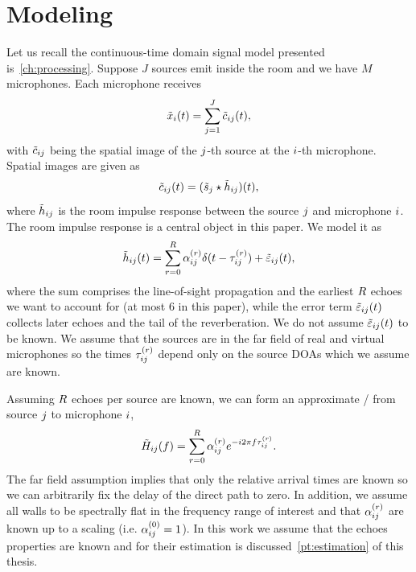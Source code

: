 \section{Modeling}
Let us recall the continuous-time domain signal model presented is~\cref{ch:processing}.
Suppose $J$ sources emit inside the room and we have $M$ microphones.
Each microphone receives
\begin{equation}
    \tilde{x}_{i}(t) = \sum_{j = 1}^{J} \tilde{c}_{ij}(t),
\end{equation}
with $\tilde{c}_{ij}$ being the spatial image of the $j$-th source at the $i$-th microphone.
Spatial images are given as
\begin{equation}
    \tilde{c}_{ij}(t) = (\tilde{s}_{j} \star \tilde{h}_{ij})(t),
\end{equation}
where $\tilde{h}_{ij}$ is the room impulse response between the source $j$ and microphone $i$.
The room impulse response is a central object in this paper.
We model it as
\begin{equation}
    \tilde{h}_{ij}(t) = \sum_{r = 0}^{R} \alpha_{ij}^{(r)} \delta(t - \tau_{ij}^{(r)}) + \tilde{\varepsilon}_{ij}(t),
\end{equation}
where the sum comprises the line-of-sight propagation and the earliest $R$ echoes we want to account for (at most 6 in this paper),
while the error term $\tilde{\varepsilon}_{ij}(t)$ collects later echoes and the tail of the reverberation.
We do not assume $\tilde{\varepsilon}_{ij}(t)$ to be known.
We assume that the sources are in the far field of real and virtual microphones so the times $\tau_{ij}^{(r)}$ depend only on the source DOAs which we assume are known.

\mynewline
Assuming $R$ echoes per source are known, we can form an approximate \RTF/ from source $j$ to microphone $i$,
\begin{equation}
    \label{eq:separake:approx_tf}
    \tilde{H}_{ij}(f) = \sum_{r=0}^{R} \alpha_{ij}^{(r)} {e}^{-{i} 2 \pi f \tau_{ij}^{(r)}}.
\end{equation}
The far field assumption implies that only the relative arrival times are known so we can arbitrarily fix the delay of the direct path to zero.
In addition, we assume all walls to be spectrally flat in the frequency range of interest and that $\alpha_{ij}^{(r)}$ are known up to a scaling (i.e. $\alpha_{ij}^{(0)} = 1$).
In this work we assume that the echoes properties are known and for their estimation is discussed~\cref{pt:estimation} of this thesis.

